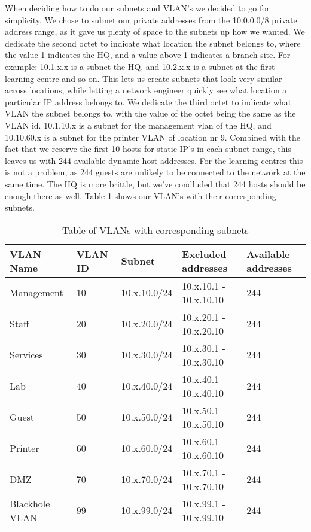 When deciding how to do our subnets and VLAN's we decided to go for simplicity. We chose to subnet our private addresses from the 10.0.0.0/8 private address range, as it gave us plenty of space to the subnets up how we wanted. We dedicate the second octet to indicate what location the subnet belongs to, where the value 1 indicates the HQ, and a value above 1 indicates a branch site. For example: 10.1.x.x is a subnet the HQ, and 10.2.x.x is a subnet at the first learning centre and so on. This lets us create subnets that look very similar across locations, while letting a network engineer quickly see what location a particular IP address belongs to. We dedicate the third octet to indicate what VLAN the subnet belongs to, with the value of the octet being the same as the VLAN id. 10.1.10.x is a subnet for the management vlan of the HQ, and 10.10.60.x is a subnet for the printer VLAN of location nr 9. Combined with the fact that we reserve the first 10 hosts for static IP's in each subnet range, this leaves us with 244 available dynamic host addresses. For the learning centres this is not a problem, as 244 guests are unlikely to be connected to the network at the same time. The HQ is more brittle, but we've condluded that 244 hosts should be enough there as well. Table \ref{vlansubnettable} shows our VLAN's with their corresponding subnets.

\begin{table}[H]
\caption{Table of VLANs with corresponding subnets}
\label{vlansubnettable}
\begin{tabular}{|l|l|l|l|l|}
\hline
\textbf{VLAN Name} & \textbf{VLAN ID} & \textbf{Subnet} & \textbf{Excluded addresses} & \textbf{Available addresses} \\ \hline

Management     & 10      & 10.x.10.0/24 & 10.x.10.1 - 10.x.10.10 & 244 \\ \hline
Staff          & 20      & 10.x.20.0/24 & 10.x.20.1 - 10.x.20.10 & 244 \\ \hline
Services       & 30      & 10.x.30.0/24 & 10.x.30.1 - 10.x.30.10 & 244 \\ \hline
Lab            & 40      & 10.x.40.0/24 & 10.x.40.1 - 10.x.40.10 & 244 \\ \hline
Guest          & 50      & 10.x.50.0/24 & 10.x.50.1 - 10.x.50.10 & 244 \\ \hline
Printer        & 60      & 10.x.60.0/24 & 10.x.60.1 - 10.x.60.10 & 244 \\ \hline
DMZ            & 70      & 10.x.70.0/24 & 10.x.70.1 - 10.x.70.10 & 244 \\ \hline
Blackhole VLAN & 99      & 10.x.99.0/24 & 10.x.99.1 - 10.x.99.10 & 244 \\ \hline
\end{tabular}
\end{table}

